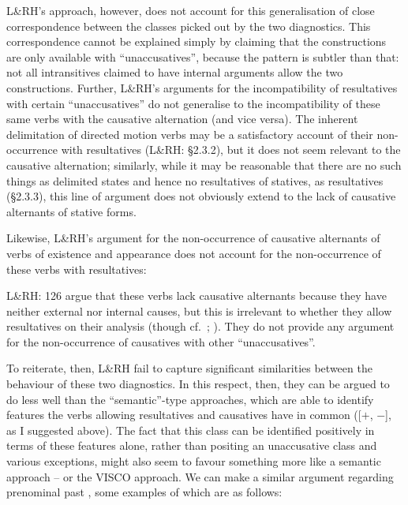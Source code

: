 \documentclass[output=paper]{langsci/langscibook}
\begin{document}
\ea
    \z
\z
L\&RH’s approach, however, does not account for this generalisation of close
correspondence between the classes picked out by the two diagnostics. This
correspondence cannot be explained simply by claiming that the constructions
are only available with \enquote{unaccusatives}, because the pattern is subtler
than that: not all intransitives claimed to have internal arguments allow the
two constructions. Further, L\&RH’s arguments for the incompatibility of
resultatives with certain \enquote{unaccusatives} do not generalise to the
incompatibility of these same verbs with the causative alternation (and vice
versa). The inherent delimitation of directed motion verbs may be a
satisfactory account of their non-occurrence with resultatives (L\&RH: §2.3.2),
but it does not seem relevant to the causative alternation; similarly, while it
may be reasonable that there are no such things as delimited states and hence
no resultatives of statives, as resultatives (§2.3.3), this line of argument
does not obviously extend to the lack of causative alternants of stative forms.

Likewise, L\&RH’s argument for the non-occurrence of causative alternants of
verbs of existence and appearance does not account for the non-occurrence of
these verbs with resultatives:

\ea
    \z
\z
L\&RH: 126 argue that these verbs lack causative alternants because they have
neither external nor internal causes, but this is irrelevant to whether they
allow resultatives on their analysis (though cf.\ \citealt{Ramchand2008};
\citealt{Baker2018,Baker2019}). They do not provide any argument for the
non-occurrence of causatives with other \enquote{unaccusatives}.

To reiterate, then, L\&RH fail to capture significant similarities between the
behaviour of these two diagnostics. In this respect, then, they can be argued
to do less well than the \enquote{semantic}-type approaches, which are able to
identify features the verbs allowing resultatives and causatives have in common
([$+$\Change{}, $-$\Initiation{}], as I suggested above). The fact that this class
can be identified positively in terms of these features alone, rather than
positing an unaccusative class and various exceptions, might also seem to
favour something more like a semantic approach – or the VISCO approach. We can
make a similar argument regarding prenominal past , some examples of
which are as follows:
\end{document}
